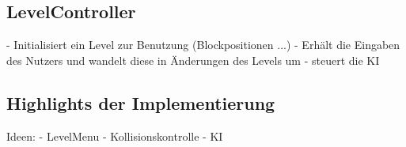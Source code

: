 \subsection{LevelController}

- Initialisiert ein Level zur Benutzung (Blockpositionen ...)
- Erhält die Eingaben des Nutzers und wandelt diese in Änderungen des Levels um
- steuert die KI

\subsection{Highlights der Implementierung}

Ideen:
- LevelMenu
- Kollisionskontrolle
- KI